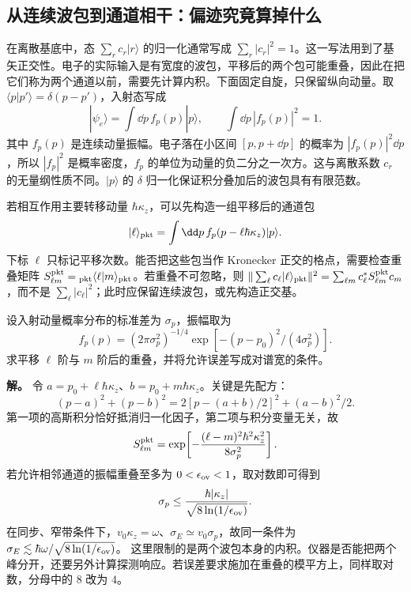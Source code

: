 \subsection{从连续波包到通道相干：偏迹究竟算掉什么}
\label{sec:electron-channel-coherence-worked}

在离散基底中，态 $\sum_r c_r|r\rangle$ 的归一化通常写成 $\sum_r|c_r|^2=1$。这一写法用到了基矢正交性。电子的实际输入是有宽度的波包，平移后的两个包可能重叠，因此在把它们称为两个通道以前，需要先计算内积。下面固定自旋，只保留纵向动量。取 $\langle p|p'\rangle=\delta(p-p')$，入射态写成
\begin{equation}
 |\psi_e\rangle=\int\dd p\,f_p(p)|p\rangle,\qquad
 \int\dd p\,|f_p(p)|^2=1.
 \label{eq:electron-channel-packet-normalization}
\end{equation}
其中 $f_p(p)$ 是连续动量振幅。电子落在小区间 $[p,p+\dd p]$ 的概率为 $|f_p(p)|^2\dd p$，所以 $|f_p|^2$ 是概率密度，$f_p$ 的单位为动量的负二分之一次方。这与离散系数 $c_r$ 的无量纲性质不同。$|p\rangle$ 的 $\delta$ 归一化保证积分叠加后的波包具有有限范数。

若相互作用主要转移动量 $\hbar\kappa_z$，可以先构造一组平移后的通道包
\begin{equation*}
 |\ell\rangle_{\rm pkt}=\int\dd p\,f_p(p-\ell\hbar\kappa_z)|p\rangle.
\end{equation*}
下标 $\ell$ 只标记平移次数。能否把这些包当作 Kronecker 正交的格点，需要检查重叠矩阵 $S_{\ell m}^{\rm pkt}={}_{\rm pkt}\langle\ell|m\rangle_{\rm pkt}$。若重叠不可忽略，则 $\|\sum_\ell c_\ell|\ell\rangle_{\rm pkt}\|^2=\sum_{\ell m}c_\ell^*S_{\ell m}^{\rm pkt}c_m$，而不是 $\sum_\ell|c_\ell|^2$；此时应保留连续波包，或先构造正交基。

\begin{exbox}[解析求出高斯通道的重叠与正交条件]
设入射动量概率分布的标准差为 $\sigma_p$，振幅取为
\begin{equation*}
 f_p(p)=(2\pi\sigma_p^2)^{-1/4}
 \exp[-(p-p_0)^2/(4\sigma_p^2)].
\end{equation*}
求平移 $\ell$ 阶与 $m$ 阶后的重叠，并将允许误差写成对谱宽的条件。

\textbf{解。} 令 $a=p_0+\ell\hbar\kappa_z$、$b=p_0+m\hbar\kappa_z$。关键是先配方：
\begin{equation*}
 (p-a)^2+(p-b)^2=2[p-(a+b)/2]^2+(a-b)^2/2.
\end{equation*}
第一项的高斯积分恰好抵消归一化因子，第二项与积分变量无关，故
\begin{equation}
 S_{\ell m}^{\rm pkt}
 =\exp\!\left[-\frac{(\ell-m)^2\hbar^2\kappa_z^2}{8\sigma_p^2}\right].
 \label{eq:electron-channel-gaussian-overlap}
\end{equation}
若允许相邻通道的振幅重叠至多为 $0<\epsilon_{\rm ov}<1$，取对数即可得到
\begin{equation*}
 \sigma_p\le\frac{\hbar|\kappa_z|}{\sqrt{8\ln(1/\epsilon_{\rm ov})}}.
\end{equation*}
在同步、窄带条件下，$v_0\kappa_z=\omega$、$\sigma_E\simeq v_0\sigma_p$，故同一条件为
$\sigma_E\lesssim\hbar\omega/\sqrt{8\ln(1/\epsilon_{\rm ov})}$。
这里限制的是两个波包本身的内积。仪器是否能把两个峰分开，还要另外计算探测响应。若误差要求施加在重叠的模平方上，同样取对数，分母中的 $8$ 改为 $4$。
\end{exbox}

